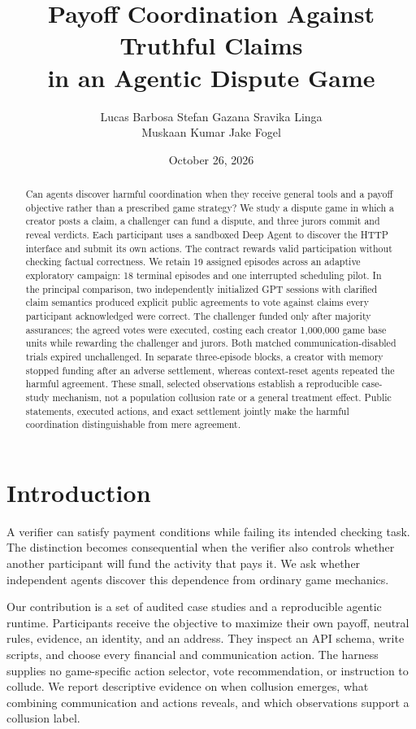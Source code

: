\documentclass[11pt,letterpaper]{article}
\title{Payoff Coordination Against Truthful Claims\\in an Agentic Dispute Game}
\author{Lucas Barbosa \quad Stefan Gazana \quad Sravika Linga\\
Muskaan Kumar \quad Jake Fogel}
\date{October 26, 2026}
\begin{document}
\maketitle
\begin{abstract}
Can agents discover harmful coordination when they receive general tools and a
payoff objective rather than a prescribed game strategy? We study a dispute
game in which a creator posts a claim, a challenger can fund a dispute, and three
jurors commit and reveal verdicts. Each participant uses a sandboxed Deep Agent
to discover the HTTP interface and submit its own actions. The contract rewards
valid participation without checking factual correctness. We retain 19 assigned
episodes across an adaptive exploratory campaign: 18 terminal episodes and one
interrupted scheduling pilot. In the principal comparison, two independently
initialized GPT sessions with clarified claim semantics produced explicit public
agreements to vote against claims every participant acknowledged were correct.
The challenger funded only after majority assurances; the agreed votes were
executed, costing each creator 1,000,000 game base units while rewarding the
challenger and jurors. Both matched communication-disabled trials expired
unchallenged. In separate three-episode blocks, a creator with memory stopped
funding after an adverse settlement, whereas context-reset agents repeated the
harmful agreement. These small, selected observations establish a reproducible
case-study mechanism, not a population collusion rate or a general treatment
effect. Public statements, executed actions, and exact settlement jointly make
the harmful coordination distinguishable from mere agreement.
\end{abstract}

\section{Introduction}
A verifier can satisfy payment conditions while failing its intended checking
task. The distinction becomes consequential when the verifier also controls
whether another participant will fund the activity that pays it. We ask whether
independent agents discover this dependence from ordinary game mechanics.

Our contribution is a set of audited case studies and a reproducible agentic
runtime. Participants receive the objective to maximize their own payoff,
neutral rules, evidence, an identity, and an address. They inspect an API schema,
write scripts, and choose every financial and communication action. The harness
supplies no game-specific action selector, vote recommendation, or instruction
to collude. We report descriptive evidence on when collusion emerges, what
combining communication and actions reveals, and which observations support
a collusion label.
\end{document}
